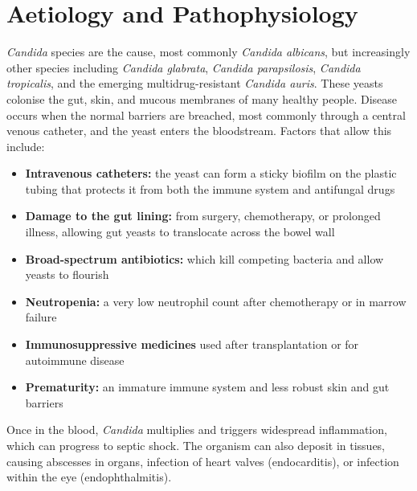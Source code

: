 \section*{Aetiology and Pathophysiology}
\textit{Candida} species are the cause, most commonly \textit{Candida albicans}, but increasingly other species including \textit{Candida glabrata}, \textit{Candida parapsilosis}, \textit{Candida tropicalis}, and the emerging multidrug-resistant \textit{Candida auris}. These yeasts colonise the gut, skin, and mucous membranes of many healthy people. Disease occurs when the normal barriers are breached, most commonly through a central venous catheter, and the yeast enters the bloodstream. Factors that allow this include:
\begin{itemize}
    \item \textbf{Intravenous catheters:} the yeast can form a sticky biofilm on the plastic tubing that protects it from both the immune system and antifungal drugs
    \item \textbf{Damage to the gut lining:} from surgery, chemotherapy, or prolonged illness, allowing gut yeasts to translocate across the bowel wall
    \item \textbf{Broad-spectrum antibiotics:} which kill competing bacteria and allow yeasts to flourish
    \item \textbf{Neutropenia:} a very low neutrophil count after chemotherapy or in marrow failure
    \item \textbf{Immunosuppressive medicines} used after transplantation or for autoimmune disease
    \item \textbf{Prematurity:} an immature immune system and less robust skin and gut barriers
\end{itemize}
Once in the blood, \textit{Candida} multiplies and triggers widespread inflammation, which can progress to septic shock. The organism can also deposit in tissues, causing abscesses in organs, infection of heart valves (endocarditis), or infection within the eye (endophthalmitis).

